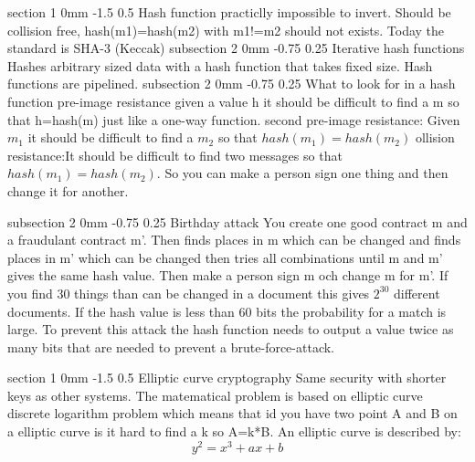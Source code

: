 \documentclass[a4paper,11pt]{article}
\makeatletter
\renewcommand{\section}{\@startsection
   {section}%
   {1}%
   {0mm}%
   {-1.5\baselineskip}%
   {0.5\baselineskip}%
   {\sffamily\bfseries\upshape\normalsize}}%
\renewcommand{\subsection}{\@startsection
   {subsection}%
   {2}%
   {0mm}%
   {-0.75\baselineskip}%
   {0.25\baselineskip}%
   {\rmfamily\normalfont\slshape\normalsize}}%
\makeatother
\begin{document}
\section{Hash function}
practiclly impossible to invert. Should be collision free, hash(m1)=hash(m2) with m1!=m2 should not exists. Today the standard is SHA-3 (Keccak)
\subsection{Iterative hash functions}
Hashes arbitrary sized data with a hash function that takes fixed size. Hash functions are pipelined.
\subsection{What to look for in a hash function}
pre-image resistance given a value h it should be difficult to find a m so that h=hash(m) just like a one-way function.
\newline
\newline
second pre-image resistance: Given $m_1$ it should be difficult to find a $m_2$ so that 
$hash(m_1)=hash(m_2)$
\newline
\newline
ollision resistance:It should be difficult to find two messages so that $hash(m_1)=hash(m_2)$. So you can make a person sign one thing and then change it for another.

\subsection{Birthday attack}
You create one good contract m and a fraudulant contract m'. Then finds places in m which can be changed and finds places in m' which can be changed then tries all combinations until m and m' gives the same hash value.
Then make a person sign m och change m for m'. If you find 30 things than can be changed in a document this gives $2^{30}$ different documents. If the hash value is less than 60 bits the probability for a match is large.
\newline
\newline
To prevent this attack the hash function needs to output a value twice as many bits that are needed to prevent a brute-force-attack.

\section{Elliptic curve cryptography}
Same security with shorter keys as other systems.
The matematical problem is based on elliptic curve discrete logarithm problem which means that id you have two point A and B on a elliptic curve is it hard to find a k so A=k*B. An elliptic curve is described by: $$y^2=x^3+ax+b$$
\end{document}
